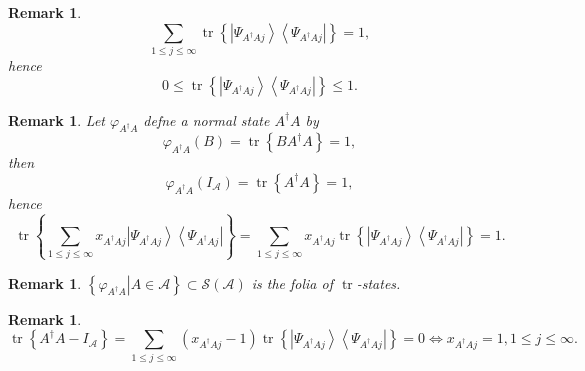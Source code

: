 \documentclass[aps,preprint]{revtex4}%
\newtheorem{remark}[theorem]{Remark}
\begin{document}
\begin{remark}%
\begin{equation}
\sum_{1\leq j\leq\infty}\operatorname*{tr}\left\{  \left\vert \Psi
_{A^{\dagger}Aj}\right\rangle \left\langle \Psi_{A^{\dagger}Aj}\right\vert
\right\}  =1,
\end{equation}
hence
\begin{equation}
0\leq\operatorname*{tr}\left\{  \left\vert \Psi_{A^{\dagger}Aj}\right\rangle
\left\langle \Psi_{A^{\dagger}Aj}\right\vert \right\}  \leq1.
\end{equation}

\end{remark}

\begin{remark}
Let $\varphi_{A^{\dagger}A}$ defne a normal state $A^{\dagger}A$ by
\begin{equation}
\varphi_{A^{\dagger}A}\left(  B\right)  =\operatorname*{tr}\left\{
BA^{\dagger}A\right\}  =1,
\end{equation}
then
\begin{equation}
\varphi_{A^{\dagger}A}\left(  I_{\mathcal{A}}\right)  =\operatorname*{tr}%
\left\{  A^{\dagger}A\right\}  =1,
\end{equation}
hence
\begin{equation}
\operatorname*{tr}\left\{  \sum_{1\leq j\leq\infty}x_{A^{\dagger}Aj}\left\vert
\Psi_{A^{\dagger}Aj}\right\rangle \left\langle \Psi_{A^{\dagger}Aj}\right\vert
\right\}  =\sum_{1\leq j\leq\infty}x_{A^{\dagger}Aj}\operatorname*{tr}\left\{
\left\vert \Psi_{A^{\dagger}Aj}\right\rangle \left\langle \Psi_{A^{\dagger}%
Aj}\right\vert \right\}  =1.
\end{equation}

\end{remark}

\begin{remark}
$\left\{  \left.  \varphi_{A^{\dagger}A}\right\vert A\in\mathcal{A}\right\}
\subset\mathcal{S}\left(  \mathcal{A}\right)  $ is the folia of
$\operatorname*{tr}$-states.
\end{remark}

\begin{remark}%
\[
\operatorname*{tr}\left\{  A^{\dagger}A-I_{\mathcal{A}}\right\}  =\sum_{1\leq
j\leq\infty}\left(  x_{A^{\dagger}Aj}-1\right)  \operatorname*{tr}\left\{
\left\vert \Psi_{A^{\dagger}Aj}\right\rangle \left\langle \Psi_{A^{\dagger}%
Aj}\right\vert \right\}  =0\Longleftrightarrow x_{A^{\dagger}Aj}=1,1\leq
j\leq\infty.
\]

\end{remark}
\end{document}
